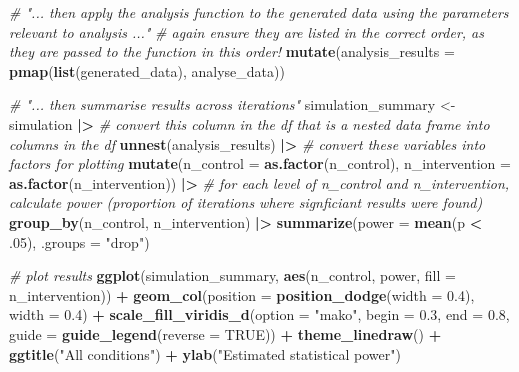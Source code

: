 \documentclass[
]{article}
\newenvironment{Shaded}{\begin{snugshade}}{\end{snugshade}}
\newcommand{\AttributeTok}[1]{\textcolor[rgb]{0.13,0.29,0.53}{#1}}
\newcommand{\CommentTok}[1]{\textcolor[rgb]{0.56,0.35,0.01}{\textit{#1}}}
\newcommand{\ConstantTok}[1]{\textcolor[rgb]{0.56,0.35,0.01}{#1}}
\newcommand{\DecValTok}[1]{\textcolor[rgb]{0.00,0.00,0.81}{#1}}
\newcommand{\FloatTok}[1]{\textcolor[rgb]{0.00,0.00,0.81}{#1}}
\newcommand{\FunctionTok}[1]{\textcolor[rgb]{0.13,0.29,0.53}{\textbf{#1}}}
\newcommand{\NormalTok}[1]{#1}
\newcommand{\OtherTok}[1]{\textcolor[rgb]{0.56,0.35,0.01}{#1}}
\newcommand{\SpecialCharTok}[1]{\textcolor[rgb]{0.81,0.36,0.00}{\textbf{#1}}}
\newcommand{\StringTok}[1]{\textcolor[rgb]{0.31,0.60,0.02}{#1}}
\begin{document}
\begin{Shaded}
\begin{Highlighting}[]
  \CommentTok{\# "... then apply the analysis function to the generated data using the parameters relevant to analysis ..."}
  \CommentTok{\# again ensure they are listed in the correct order, as they are passed to the function in this order!}
  \FunctionTok{mutate}\NormalTok{(}\AttributeTok{analysis\_results =} \FunctionTok{pmap}\NormalTok{(}\FunctionTok{list}\NormalTok{(generated\_data),}
\NormalTok{                                 analyse\_data))}
  

\CommentTok{\# "... then summarise results across iterations"}
\NormalTok{simulation\_summary }\OtherTok{\textless{}{-}}\NormalTok{ simulation }\SpecialCharTok{|\textgreater{}}
  \CommentTok{\# convert this column in the df that is a nested data frame into columns in the df}
  \FunctionTok{unnest}\NormalTok{(analysis\_results) }\SpecialCharTok{|\textgreater{}} 
  \CommentTok{\# convert these variables into factors for plotting}
  \FunctionTok{mutate}\NormalTok{(}\AttributeTok{n\_control =} \FunctionTok{as.factor}\NormalTok{(n\_control), }
         \AttributeTok{n\_intervention =} \FunctionTok{as.factor}\NormalTok{(n\_intervention)) }\SpecialCharTok{|\textgreater{}}
  \CommentTok{\# for each level of n\_control and n\_intervention, calculate power (proportion of iterations where signficiant results were found)}
  \FunctionTok{group\_by}\NormalTok{(n\_control, }
\NormalTok{           n\_intervention) }\SpecialCharTok{|\textgreater{}}
  \FunctionTok{summarize}\NormalTok{(}\AttributeTok{power =} \FunctionTok{mean}\NormalTok{(p }\SpecialCharTok{\textless{}}\NormalTok{ .}\DecValTok{05}\NormalTok{), }\AttributeTok{.groups =} \StringTok{"drop"}\NormalTok{)}

\CommentTok{\# plot results}
\FunctionTok{ggplot}\NormalTok{(simulation\_summary, }\FunctionTok{aes}\NormalTok{(n\_control, power, }\AttributeTok{fill =}\NormalTok{ n\_intervention)) }\SpecialCharTok{+}
  \FunctionTok{geom\_col}\NormalTok{(}\AttributeTok{position =} \FunctionTok{position\_dodge}\NormalTok{(}\AttributeTok{width =} \FloatTok{0.4}\NormalTok{), }\AttributeTok{width =} \FloatTok{0.4}\NormalTok{) }\SpecialCharTok{+}
  \FunctionTok{scale\_fill\_viridis\_d}\NormalTok{(}\AttributeTok{option =} \StringTok{"mako"}\NormalTok{, }\AttributeTok{begin =} \FloatTok{0.3}\NormalTok{, }\AttributeTok{end =} \FloatTok{0.8}\NormalTok{, }
                       \AttributeTok{guide =} \FunctionTok{guide\_legend}\NormalTok{(}\AttributeTok{reverse =} \ConstantTok{TRUE}\NormalTok{)) }\SpecialCharTok{+}
  \FunctionTok{theme\_linedraw}\NormalTok{() }\SpecialCharTok{+}
  \FunctionTok{ggtitle}\NormalTok{(}\StringTok{"All conditions"}\NormalTok{) }\SpecialCharTok{+}
  \FunctionTok{ylab}\NormalTok{(}\StringTok{"Estimated statistical power"}\NormalTok{)}
\end{Highlighting}
\end{Shaded}
\end{document}
